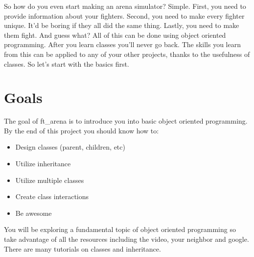 \documentclass{42-en}
\begin{document}

	So how do you even start making an arena simulator? Simple. First, you
	need to provide information about your fighters. Second, you need to make
	every fighter unique. It'd be boring if they all did the same thing. 
	Lastly, you need to make them fight. And guess what? All of this can be done
	using object oriented programming. After you learn classes you'll never
	go back. The skills you learn from this can be applied to any of your other
	projects, thanks to the usefulness of classes. So let's start with the basics
	first.\\


\chapter{Goals}

	The goal of ft\_arena is to introduce you into basic object oriented programming.
	By the end of this project you should know how to:\\
	
	\begin{itemize}
		\item Design classes (parent, children, etc)
		\item Utilize inheritance
		\item Utilize multiple classes
		\item Create class interactions
		\item Be awesome\\
	\end{itemize}
	 
	You will be exploring a fundamental topic of object oriented programming
	so take advantage of all the resources including the video, your neighbor
	and google. There are many tutorials on classes and inheritance.


\end{document}
